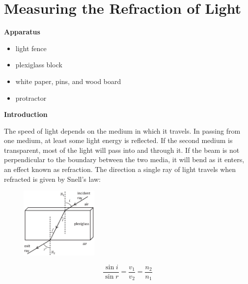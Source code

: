 
\section{Measuring the Refraction of Light}

\makelabheader %



\bigskip
\textbf{Apparatus} 

\begin{itemize}[nosep]
\item light fence 
\item plexiglass block 
\item white paper, pins, and wood board 
\item protractor
\end{itemize}

\textbf{Introduction}

The speed of light depends on the medium in which it travels. In passing
from one medium, at least some light energy is reflected. If the second
medium is transparent, most of the light will pass into and through
it. If the beam is not perpendicular to the boundary between the two
media, it will bend as it enters, an effect known as refraction. The
direction a single ray of light travels when refracted is given by
Snell's law:
\begin{figure}
\begin{raggedleft}
\vspace{0.1in}
\includegraphics[width=0.34\textwidth]{refraction_of_light/plexiglass_figure.eps}

\end{raggedleft}
\end{figure}
\begin{displaymath} \frac{\sin i}{\sin r} = \frac{v_1}{v_2} = \frac{n_2}{n_1} \end{displaymath}

